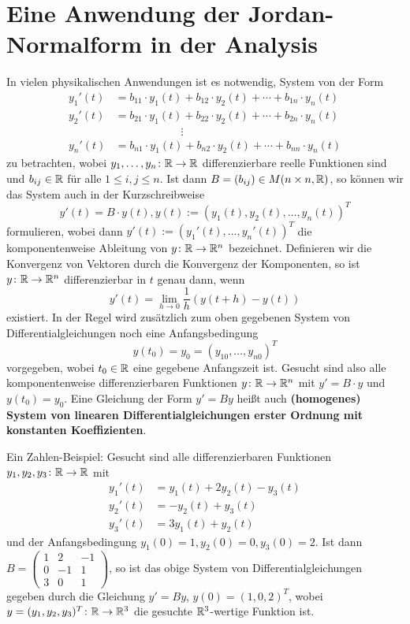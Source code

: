 \section{Eine Anwendung der Jordan-Normalform in der Analysis}
\label{sec:2.10}

In vielen physikalischen Anwendungen ist es notwendig, System von  der Form
\begin{align*}
	y_1'(t) &= b_{11} \cdot y_1(t) + b_{12} \cdot y_2(t) + \cdots + b_{1n} \cdot y_n(t) \\
	y_2'(t) &= b_{21} \cdot y_1(t) + b_{22} \cdot y_2(t) + \cdots + b_{2n} \cdot y_n(t) \\
	 & \qquad \qquad \qquad \vdots \\
	y_n'(t) &= b_{n1} \cdot y_1(t) + b_{n2} \cdot y_2(t) + \cdots + b_{nn} \cdot y_n(t)
\end{align*}
zu betrachten, wobei $y_1,\dots,y_n\colon \mathbb{R} \rightarrow \mathbb{R}$ differenzierbare reelle Funktionen sind und $b_{ij} \in \mathbb{R}$ für alle $1 \leq i,j \leq n$.
Ist dann $B = (b_{ij}) \in M(n \times n, \mathbb{R})$, so können wir das System auch in der Kurzschreibweise
\[
	y'(t) = B \cdot y(t), y(t) := (y_1(t),y_2(t),\dots,y_n(t))^T
\]
formulieren, wobei dann $y'(t) := (y_1'(t),\dots,y_n'(t))^T$ die komponentenweise Ableitung von $y\colon \mathbb{R} \rightarrow \mathbb{R}^n$ bezeichnet.
Definieren wir die Konvergenz von Vektoren durch die Konvergenz der Komponenten, so ist $y \colon \mathbb{R} \rightarrow \mathbb{R}^n$ differenzierbar in $t$ genau dann, wenn
\[
	y'(t) = \lim\limits_{h \rightarrow 0} \frac{1}{h} (y(t+h)-y(t))
\]
existiert.
In der Regel wird zusätzlich zum oben gegebenen System von Differentialgleichungen noch eine Anfangsbedingung
\[
	y(t_0) = y_0 = (y_{10},\dots,y_{n0})^T
\]
vorgegeben, wobei $t_0 \in \mathbb{R}$ eine gegebene Anfangszeit ist.
Gesucht sind also alle komponentenweise differenzierbaren Funktionen $y \colon \mathbb{R} \rightarrow \mathbb{R}^n$ mit $y' = B \cdot y$ und $y(t_0) = y_0$.
Eine Gleichung der Form $y' = By$ heißt auch \textbf{(homogenes) System von linearen Differentialgleichungen erster Ordnung mit konstanten Koeffizienten}.

\begin{beispiel}
	\label{bsp:10.1}
	Ein Zahlen-Beispiel:
	Gesucht sind alle differenzierbaren Funktionen $y_1,y_2,y_3\colon \mathbb{R} \rightarrow \mathbb{R}$ mit
	\begin{align*}
		y_1'(t) &= y_1(t) + 2y_2(t) - y_3(t) \\
		y_2'(t) &= -y_2(t) + y_3(t) \\
		y_3'(t) &= 3y_1(t) + y_2(t)
	\end{align*}
	und der Anfangsbedingung $y_1(0) = 1, y_2(0) = 0, y_3(0)=2$.
	Ist dann $B = \begin{pmatrix}
		1 & 2 & -1 \\
		0 & -1 & 1 \\
		3 & 0 & 1
	\end{pmatrix}$, so ist das obige System von Differentialgleichungen gegeben durch die Gleichung $y' = By$, $y(0) = (1,0,2)^T$, wobei $y = (y_1,y_2,y_3)^T \colon \mathbb{R} \rightarrow \mathbb{R}^3$ die gesuchte $\mathbb{R}^3$-wertige Funktion ist.
\end{beispiel}

